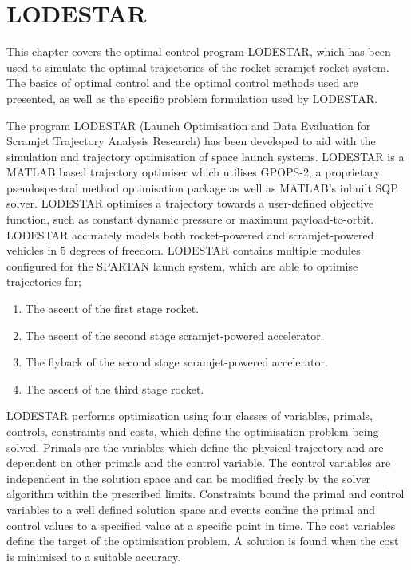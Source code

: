 
\cleardoublepage
\chapter{LODESTAR}\label{chapter:experimental-results}	
This chapter covers the optimal control program LODESTAR, which has been used to simulate the optimal trajectories of the rocket-scramjet-rocket system. The basics of optimal control and the optimal control methods used are presented, as well as the specific problem formulation used by LODESTAR.

The program LODESTAR (Launch Optimisation and Data Evaluation for Scramjet Trajectory Analysis Research) has been developed to aid with the simulation and trajectory optimisation of space launch systems. LODESTAR is a MATLAB based trajectory optimiser which utilises GPOPS-2, a proprietary pseudospectral method optimisation package as well as MATLAB's inbuilt SQP solver. LODESTAR optimises a trajectory towards a user-defined objective function, such as constant dynamic pressure or maximum payload-to-orbit.  LODESTAR accurately models both rocket-powered and scramjet-powered vehicles in 5 degrees of freedom. LODESTAR contains multiple modules configured for the SPARTAN launch system, which are able to optimise trajectories for;

\begin{enumerate}
 \item The ascent of the first stage rocket.
 \item The ascent of the second stage scramjet-powered accelerator.
 \item The flyback of the second stage scramjet-powered accelerator.
 \item The ascent of the third stage rocket.
\end{enumerate}

LODESTAR performs optimisation using four classes of variables, primals, controls, constraints and costs, which define the optimisation problem being solved. Primals are the variables which define the physical trajectory and are dependent on other primals and the control variable. The control variables are independent in the solution space and can be modified freely by the solver algorithm within the prescribed limits.  Constraints bound the primal and control variables to a well defined solution space and events confine the primal and control values to a specified value at a specific point in time. The cost variables define the target of the optimisation problem. A solution is found when the cost is minimised to a suitable accuracy. 

